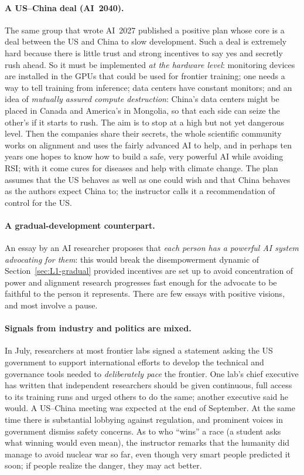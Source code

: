 \paragraph{A US--China deal (AI~2040).}
The same group that wrote AI~2027 published a positive plan whose core is a deal between the US and China to slow development. Such a deal is extremely hard because there is little trust and strong incentives to say yes and secretly rush ahead. So it must be implemented \emph{at the hardware level}:
monitoring devices are installed in the GPUs that could be used for frontier training; one needs a way to tell training from inference; data centers have constant monitors; and an idea of \emph{mutually assured compute destruction}: China's data centers might be placed in Canada and America's in Mongolia, so that each side can seize
the other's if it starts to rush. The aim is to stop at a high but not yet dangerous level. Then the companies share their secrets, the whole scientific community works on alignment and uses the fairly advanced AI to help, and in perhaps ten years one hopes to know how to build a safe, very powerful AI while avoiding RSI;
with it come cures for diseases and help with climate change. The plan assumes that the US behaves as well as one could wish and that China behaves as the authors expect China to; the instructor calls it a recommendation of control for the US.

\paragraph{A gradual-development counterpart.}
An essay by an AI researcher\flag{} proposes that \emph{each person has a powerful AI system advocating for them}: this would break the disempowerment dynamic of Section~\ref{sec:L1-gradual} provided incentives are set up to avoid concentration of power and alignment research progresses fast enough for the advocate to be faithful to the person it represents.
There are few essays with positive visions, and most involve a pause.

\paragraph{Signals from industry and politics are mixed.}
In July, researchers at most frontier labs signed a statement asking the US government to support international efforts to develop the technical and governance tools needed to \emph{deliberately pace} the frontier. One lab's chief executive has written that independent
researchers should be given continuous, full access to its training runs and urged others to do the same; another executive said he would. A US--China meeting was expected at the end of September. At the same time there is substantial lobbying against regulation, and prominent
voices in government dismiss safety concerns. As to who ``wins'' a race (a student asks what winning would even mean), the instructor remarks that the humanity did manage to avoid nuclear war so far, even though very smart people predicted it soon; if people realize the danger, they may act better.

